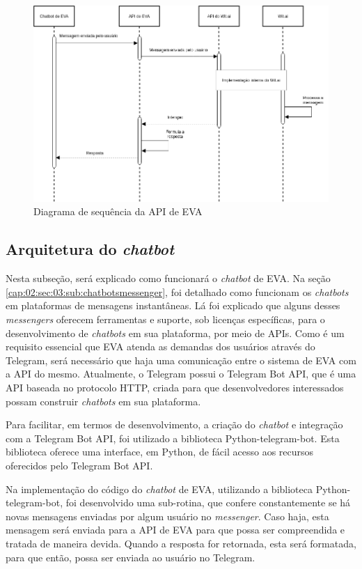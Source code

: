 \begin{figure}
  \caption{
    \label{cap:03:fig:diagrama-sequencia-1}
    Diagrama de sequência da API de EVA
  }
  \includegraphics[width=0.7\linewidth]{imagens/EVAAPISEQUENCE.png}
  \mfonte
\end{figure}

\subsection{Arquitetura do \textit{chatbot}}\label{eva-arquitetura-chatbot}

Nesta subseção, será explicado como funcionará o \textit{chatbot} de EVA. Na seção \ref{cap:02:sec:03:sub:chatbotsmessenger}, foi detalhado como funcionam os \textit{chatbots} em plataformas de mensagens instantâneas. Lá foi explicado que alguns desses \textit{messengers} oferecem ferramentas e suporte, sob licenças específicas, para o desenvolvimento de \textit{chatbots} em sua plataforma, por meio de APIs. Como é um requisito essencial que EVA atenda as demandas dos usuários através do Telegram, será necessário que haja uma comunicação entre o sistema de EVA com a API do mesmo. Atualmente, o Telegram possui o Telegram Bot API, que é uma API baseada no protocolo HTTP, criada para que desenvolvedores interessados possam construir \textit{chatbots} em sua plataforma.

Para facilitar, em termos de desenvolvimento, a criação do \textit{chatbot} e integração com a Telegram Bot API, foi utilizado a biblioteca Python-telegram-bot. Esta biblioteca oferece uma interface, em Python, de fácil acesso aos recursos oferecidos pelo Telegram Bot API.

Na implementação do código do \textit{chatbot} de EVA, utilizando a biblioteca Python-telegram-bot, foi desenvolvido uma sub-rotina, que confere constantemente se há novas mensagens enviadas por algum usuário no \textit{messenger}. Caso haja, esta mensagem será enviada para a API de EVA para que possa ser compreendida e tratada de maneira devida. Quando a resposta for retornada, esta será formatada, para que então, possa ser enviada ao usuário no Telegram.

